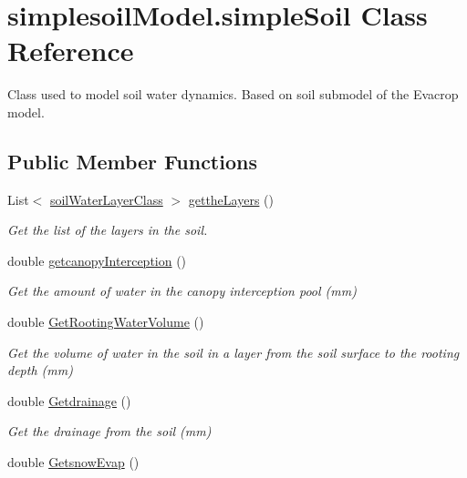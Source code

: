 \hypertarget{classsimplesoil_model_1_1simple_soil}{}\section{simplesoil\+Model.\+simple\+Soil Class Reference}
\label{classsimplesoil_model_1_1simple_soil}


Class used to model soil water dynamics. Based on soil submodel of the Evacrop model.  


\subsection*{Public Member Functions}
\begin{DoxyCompactItemize}
\item 
List$<$ \mbox{\hyperlink{classsimplesoil_model_1_1soil_water_layer_class}{soil\+Water\+Layer\+Class}} $>$ \mbox{\hyperlink{classsimplesoil_model_1_1simple_soil_a2bdef505d32a606cc6937983a77abed2}{getthe\+Layers}} ()
\begin{DoxyCompactList}\small\item\em Get the list of the layers in the soil. \end{DoxyCompactList}\item 
double \mbox{\hyperlink{classsimplesoil_model_1_1simple_soil_a8409280085e27eeab591070b94e39674}{getcanopy\+Interception}} ()
\begin{DoxyCompactList}\small\item\em Get the amount of water in the canopy interception pool (mm) \end{DoxyCompactList}\item 
double \mbox{\hyperlink{classsimplesoil_model_1_1simple_soil_a9784cacbb68950312021f3ff082c0fa5}{Get\+Rooting\+Water\+Volume}} ()
\begin{DoxyCompactList}\small\item\em Get the volume of water in the soil in a layer from the soil surface to the rooting depth (mm) \end{DoxyCompactList}\item 
double \mbox{\hyperlink{classsimplesoil_model_1_1simple_soil_a9809c673d928e457714aff6a2da5803e}{Getdrainage}} ()
\begin{DoxyCompactList}\small\item\em Get the drainage from the soil (mm) \end{DoxyCompactList}\item 
double \mbox{\hyperlink{classsimplesoil_model_1_1simple_soil_a3745efc62197a3432e8dc6065e008a6e}{Getsnow\+Evap}} ()

\end{DoxyCompactItemize}
